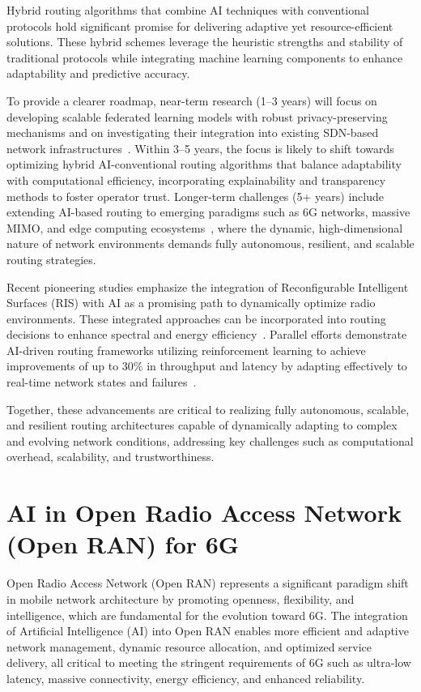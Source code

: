 \documentclass[sigconf]{acmart}
\begin{document}
Hybrid routing algorithms that combine AI techniques with conventional protocols hold significant promise for delivering adaptive yet resource-efficient solutions. These hybrid schemes leverage the heuristic strengths and stability of traditional protocols while integrating machine learning components to enhance adaptability and predictive accuracy.

To provide a clearer roadmap, near-term research (1--3 years) will focus on developing scalable federated learning models with robust privacy-preserving mechanisms and on investigating their integration into existing SDN-based network infrastructures~\cite{ref53}. Within 3--5 years, the focus is likely to shift towards optimizing hybrid AI-conventional routing algorithms that balance adaptability with computational efficiency, incorporating explainability and transparency methods to foster operator trust. Longer-term challenges (5+ years) include extending AI-based routing to emerging paradigms such as 6G networks, massive MIMO, and edge computing ecosystems~\cite{ref53,ref49}, where the dynamic, high-dimensional nature of network environments demands fully autonomous, resilient, and scalable routing strategies.

Recent pioneering studies emphasize the integration of Reconfigurable Intelligent Surfaces (RIS) with AI as a promising path to dynamically optimize radio environments. These integrated approaches can be incorporated into routing decisions to enhance spectral and energy efficiency~\cite{ref49}. Parallel efforts demonstrate AI-driven routing frameworks utilizing reinforcement learning to achieve improvements of up to 30\% in throughput and latency by adapting effectively to real-time network states and failures~\cite{ref53}.

Together, these advancements are critical to realizing fully autonomous, scalable, and resilient routing architectures capable of dynamically adapting to complex and evolving network conditions, addressing key challenges such as computational overhead, scalability, and trustworthiness.

\section{AI in Open Radio Access Network (Open RAN) for 6G}
Open Radio Access Network (Open RAN) represents a significant paradigm shift in mobile network architecture by promoting openness, flexibility, and intelligence, which are fundamental for the evolution toward 6G. The integration of Artificial Intelligence (AI) into Open RAN enables more efficient and adaptive network management, dynamic resource allocation, and optimized service delivery, all critical to meeting the stringent requirements of 6G such as ultra-low latency, massive connectivity, energy efficiency, and enhanced reliability.
\end{document}
